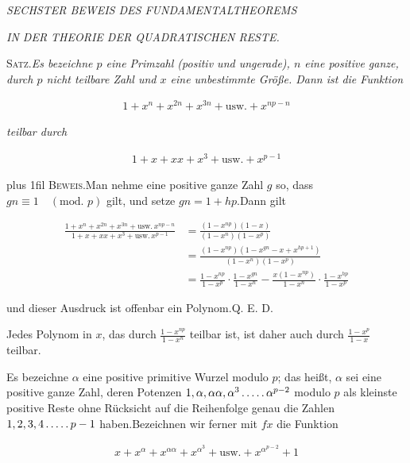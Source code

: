 \begin{center}
\textit{SECHSTER BEWEIS DES FUNDAMENTALTHEOREMS}\par
\textit{IN DER THEORIE DER QUADRATISCHEN RESTE.}
\end{center}


\textsc{Satz.}\quad \textit{Es bezeichne $p$ eine Primzahl (positiv und ungerade), $n$ eine positive ganze, durch $p$ nicht teilbare Zahl und $x$ eine unbestimmte Größe. Dann ist die Funktion}

\[
\begin{aligned}
1+x^n+x^{2n}+x^{3n}+\text{usw.}+x^{np-n}
\end{aligned}
\]

\textit{teilbar durch}

\[
\begin{aligned}
1+x+xx+x^3+\text{usw.}+x^{p-1}
\end{aligned}
\]

{\rightskip=0pt plus 1fil \textsc{Beweis.}\quad Man nehme eine positive ganze Zahl $g$ so, dass $gn\equiv1\quad(\text{mod. }p)$ gilt, und setze $gn=1+hp$.\quad Dann gilt\par}

{\small
\[
\begin{aligned}
\frac{1+x^n+x^{2n}+x^{3n}+\text{usw.}\,x^{np-n}}{1+x+xx+x^3+\text{usw.}\,x^{p-1}} &=\frac{(1-x^{np})(1-x)}{(1-x^n)(1-x^p)}\\&=\frac{(1-x^{np})(1-x^{gn}-x+x^{hp+1})}{(1-x^n)(1-x^p)}\\
&=\frac{1-x^{np}}{1-x^p}\cdot\frac{1-x^{gn}}{1-x^n}-\frac{x(1-x^{np})}{1-x^n}\cdot\frac{1-x^{hp}}{1-x^p}
\end{aligned}
\]
}

und dieser Ausdruck ist offenbar ein Polynom.\quad Q. E. D.

Jedes Polynom in $x$, das durch $\frac{1-x^{np}}{1-x^n}$ teilbar ist, ist daher auch durch $\frac{1-x^p}{1-x}$ teilbar.


Es bezeichne $\alpha$ eine positive primitive Wurzel modulo $p$; das heißt, $\alpha$ sei eine positive ganze Zahl, deren Potenzen $1,\alpha,\alpha\alpha,\alpha^3\mathinner{.\,.\,.\,.\,.}\alpha^{p-2}$ modulo $p$ als kleinste positive Reste ohne Rücksicht auf die Reihenfolge genau die Zahlen $1,2,3,4\mathinner{.\,.\,.\,.\,.} p-1$ haben.\quad Bezeichnen wir ferner mit $fx$ die Funktion

\[
\begin{aligned}
x+x^\alpha+x^{\alpha\alpha}+x^{\alpha^3}+\text{usw.}+x^{\alpha^{p-2}}+1
\end{aligned}
\]

